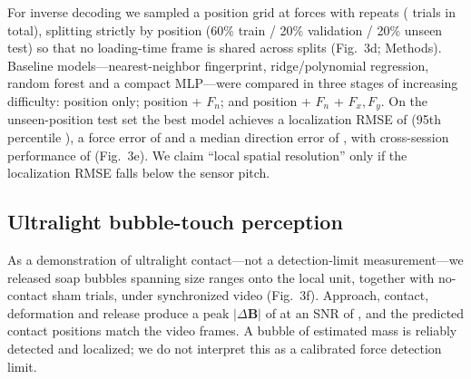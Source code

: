 For inverse decoding we sampled a 
position grid at  forces with
 repeats ( trials in total),
splitting strictly by position (60\% train / 20\% validation / 20\% unseen
test) so that no loading-time frame is shared across splits (Fig.~3d;
Methods). Baseline models---nearest-neighbor fingerprint, ridge/polynomial
regression, random forest and a compact MLP---were compared in three stages
of increasing difficulty: position only; position + $F_n$; and position +
$F_n$ + $F_x,F_y$. On the unseen-position test set the best model achieves
a localization RMSE of  (95th percentile
), a force error of
 and a median direction error of
, with cross-session performance of
 (Fig.~3e). We claim ``local spatial
resolution'' only if the localization RMSE falls below the sensor pitch.

\subsection*{Ultralight bubble-touch perception}
As a demonstration of ultralight contact---not a detection-limit
measurement---we released 
soap bubbles spanning  size ranges
onto the local unit, together with 
no-contact sham trials, under synchronized video (Fig.~3f). Approach,
contact, deformation and release produce a peak $|\Delta\mathbf{B}|$ of
 at an SNR of , and
the predicted contact positions match the video frames. A bubble of
estimated mass  is reliably detected
and localized; we do not interpret this as a calibrated force detection
limit.

